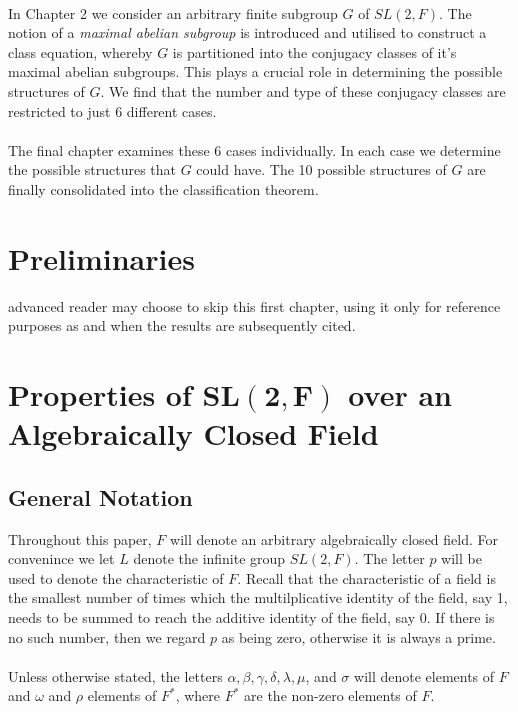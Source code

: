 \documentclass[a4paper , 11pt]{book}
\theoremstyle{definition}
\theoremstyle{remark}
\begin{document}
\vspace{-0.2mm}
\\
In Chapter 2 we consider an arbitrary finite subgroup $G$ of $SL(2,F)$. The notion of a \textit{maximal abelian subgroup} is introduced and utilised to construct a class equation, whereby $G$ is partitioned into the conjugacy classes of it's maximal abelian subgroups. This plays a crucial role in determining the possible structures of $G$. We find that the number and type of these conjugacy classes are restricted to just 6 different cases. \\
\vspace{-0.2mm}
\\
The final chapter examines these 6 cases individually. In each case we determine the possible structures that $G$ could have. The 10 possible structures of $G$ are finally consolidated into the classification theorem.


\newpage\phantom{blabla}
\thispagestyle{plain}

\chapter[Preliminaries]{Preliminaries}

 advanced reader may choose to skip this first chapter, using it only for reference purposes as and when the results are subsequently cited.  

\chapter[Properties of $\pmb{SL(2,F)}$ over an Algebraically Closed Field]{Properties of $\pmb{SL(2,F)}$ over an Algebraically Closed Field}

\section{General Notation}

Throughout this paper, $F$ will denote an arbitrary algebraically closed field. For convenince we let $L$ denote the infinite group $SL(2,F)$. The letter $p$ will be used to denote the characteristic of $F$. Recall that the characteristic of a field is the smallest number of times which the multilplicative identity of the field, say 1, needs to be summed to reach the additive identity of the field, say 0. If there is no such number, then we regard $p$ as being zero, otherwise it is always a prime. \\
\\
Unless otherwise stated, the letters $\alpha, \beta, \gamma, \delta, \lambda, \mu$, and $\sigma$ will denote elements of $F$ and $\omega$ and $\rho$ elements of $F^*$, where $F^*$  are the non-zero elements of $F$.
\end{document}
